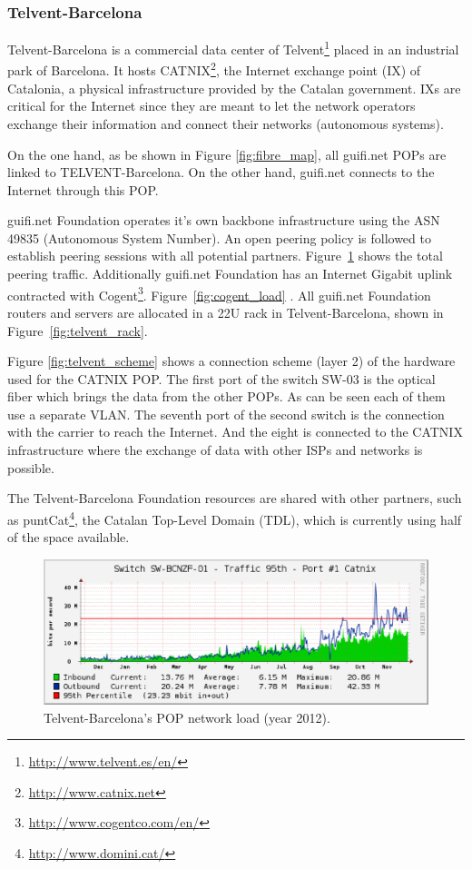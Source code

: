 \subsubsection{Telvent-Barcelona}

Telvent-Barcelona is a commercial data center of Telvent\footnote{\url{http://www.telvent.es/en/}} placed in an industrial park of Barcelona. It hosts CATNIX\footnote{\url{http://www.catnix.net}}, the Internet exchange point (IX) of Catalonia, a physical infrastructure provided by the Catalan government. IXs are critical for the Internet since they are meant to let the network operators exchange their information and connect their networks (autonomous systems). 

On the one hand, as be shown in Figure \ref{fig:fibre_map}, all guifi.net POPs are linked to TELVENT-Barcelona. On the other hand, guifi.net connects to the Internet through this POP.

guifi.net Foundation operates it's own backbone infrastructure using the ASN 49835 (Autonomous System Number). 
An open peering policy is followed to establish peering sessions with all potential partners. Figure~\ref{fig:catnix_net_load} shows the total peering traffic. Additionally guifi.net Foundation has an Internet Gigabit uplink contracted with Cogent\footnote{\url{http://www.cogentco.com/en/}}. Figure~\ref{fig:cogent_load} . All guifi.net Foundation routers and servers are allocated in a 22U rack in Telvent-Barcelona, shown in Figure~\ref{fig:telvent_rack}. 


Figure \ref{fig:telvent_scheme} shows a connection scheme (layer 2) of the hardware used for the CATNIX POP. 
The first port of the switch SW-03 is the optical fiber which brings the data from the other POPs. As can be seen each
of them use a separate VLAN. The seventh port of the second switch is the connection with the carrier to reach the Internet.
And the eight is connected to the CATNIX infrastructure where the exchange of data with other ISPs and networks is possible. 


The Telvent-Barcelona Foundation resources are shared with other partners, such as puntCat\footnote{\url{http://www.domini.cat/}}, the Catalan Top-Level Domain (TDL), which is currently using half of the space available.

\begin{figure}[htbp]
  \centering
  \includegraphics[scale=.65]{sect3/figures/catnix_network_load_year.eps} 
  \caption{Telvent-Barcelona's POP network load (year 2012).}
  \label{fig:catnix_net_load}
\end{figure}


